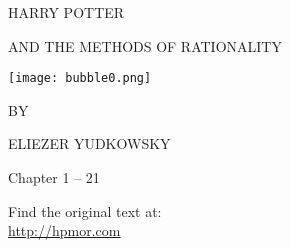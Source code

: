 


\begin{center}
\thispagestyle{empty}
{\hp
\Huge\MakeUppercase{Harry Potter}\vspace*{0.5cm}

\Large\MakeUppercase{and the Methods of Rationality} %
 
\texttt{[image: bubble0.png]} 

\Large BY \vspace*{.25cm}

\huge ELIEZER YUDKOWSKY%

\normalsize

\vspace*{1\baselineskip}
}

Chapter 1 -- 21


\vspace{3cm}
Find the original text at:\\
\url{http://hpmor.com} \\

\end{center}
